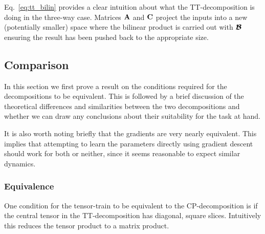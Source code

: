 Eq.~\eqref{eq:tt_bilin} provides a clear intuition about what the TT-decomposition is doing in 
the three-way case.
Matrices \(\mathbf{A}\) and \(\mathbf{C}\) project the inputs into a new (potentially smaller) space
where the bilinear product is carried out with \(\bm{\mathcal{B}}\) ensuring the result has been pushed
back to the appropriate size.


\subsection{Comparison}
In this section we first prove a result on the conditions required for the decompositions to
be equivalent. This is followed by a brief discussion of the theoretical differences and
similarities between the two decompositions and whether we can draw any conclusions about their
suitability for the task at hand. 

It is also worth noting briefly that the gradients are very nearly equivalent. This implies
that attempting to learn the parameters directly using gradient descent should work for both
or neither, since it seems reasonable to expect similar dynamics.

\subsubsection{Equivalence}
One condition for the tensor-train to be equivalent to the CP-decomposition is if the central
tensor in the TT-decomposition has diagonal, square slices. Intuitively this reduces the tensor
product to a matrix product. 

